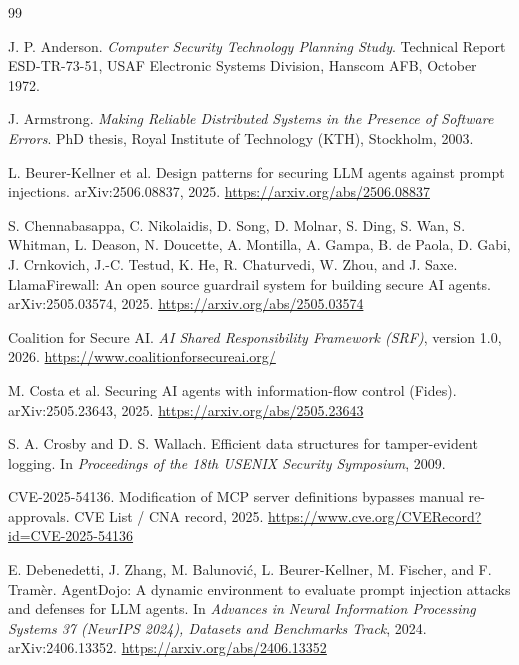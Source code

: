 \documentclass[11pt,letterpaper]{article}
\begin{document}
\begin{thebibliography}{99}
\small

J. P. Anderson.
\newblock \emph{Computer Security Technology Planning Study}.
\newblock Technical Report ESD-TR-73-51, USAF Electronic Systems Division, Hanscom AFB, October 1972.

J. Armstrong.
\newblock \emph{Making Reliable Distributed Systems in the Presence of Software Errors}.
\newblock PhD thesis, Royal Institute of Technology (KTH), Stockholm, 2003.

L. Beurer-Kellner et al.
\newblock Design patterns for securing LLM agents against prompt injections.
\newblock arXiv:2506.08837, 2025. \url{https://arxiv.org/abs/2506.08837}
\newblock [Preprint.]

S. Chennabasappa, C. Nikolaidis, D. Song, D. Molnar, S. Ding, S. Wan, S. Whitman, L. Deason, N. Doucette, A. Montilla, A. Gampa, B. de Paola, D. Gabi, J. Crnkovich, J.-C. Testud, K. He, R. Chaturvedi, W. Zhou, and J. Saxe.
\newblock LlamaFirewall: An open source guardrail system for building secure AI agents.
\newblock arXiv:2505.03574, 2025. \url{https://arxiv.org/abs/2505.03574}
\newblock [Preprint.]

Coalition for Secure AI.
\newblock \emph{AI Shared Responsibility Framework (SRF)}, version 1.0, 2026.
\newblock \url{https://www.coalitionforsecureai.org/}

M. Costa et al.
\newblock Securing AI agents with information-flow control (Fides).
\newblock arXiv:2505.23643, 2025. \url{https://arxiv.org/abs/2505.23643}
\newblock [Preprint.]

S. A. Crosby and D. S. Wallach.
\newblock Efficient data structures for tamper-evident logging.
\newblock In \emph{Proceedings of the 18th USENIX Security Symposium}, 2009.

CVE-2025-54136.
\newblock Modification of MCP server definitions bypasses manual re-approvals.
\newblock CVE List / CNA record, 2025. \url{https://www.cve.org/CVERecord?id=CVE-2025-54136}

E. Debenedetti, J. Zhang, M. Balunovi\'{c}, L. Beurer-Kellner, M. Fischer, and F. Tram\`{e}r.
\newblock AgentDojo: A dynamic environment to evaluate prompt injection attacks and defenses for LLM agents.
\newblock In \emph{Advances in Neural Information Processing Systems 37 (NeurIPS 2024), Datasets and Benchmarks Track}, 2024.
\newblock arXiv:2406.13352. \url{https://arxiv.org/abs/2406.13352}


\end{thebibliography}
\end{document}
